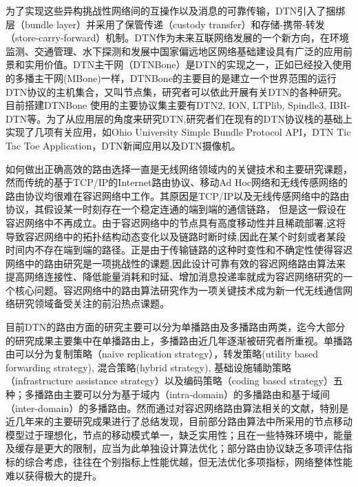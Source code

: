     为了实现这些异构挑战性网络间的互操作以及消息的可靠传输，DTN引入了捆绑层（bundle layer）并采用了保管传递（custody transfer）和存储-携带-转发（store-carry-forward）机制。DTN作为未来互联网络发展的一个新方向，在环境监测、交通管理、水下探测和发展中国家偏远地区网络基础建设具有广泛的应用前景和实用价值。DTN主干网（DTNBone）是DTN的实现之一，正如已经投入使用的多播主干网(MBone)一样，DTNBone的主要目的是建立一个世界范围的运行DTN协议的主机集合，又叫节点集，研究者可以依此开展有关DTN的各种研究。目前搭建DTNBone 使用的主要协议集主要有DTN2, ION, LTPlib, Spindle3, IBR-DTN等。为了从应用层的角度来研究DTN,研究者们在现有的DTN协议栈的基础上实现了几项有关应用，如Ohio University Simple Bundle Protocol API，DTN Tic Tac Toe Application，DTN新闻应用以及DTN摄像机。

如何做出正确高效的路由选择一直是无线网络领域内的关键技术和主要研究课题，然而传统的基于TCP/IP的Internet路由协议、移动Ad Hoc网络和无线传感网络的路由协议均很难在容迟网络中工作。其原因是TCP/IP以及无线传感网络中的路由协议，其假设某一时刻存在一个稳定连通的端到端的通信链路， 但是这一假设在容迟网络中不再成立。由于容迟网络中的节点具有高度移动性并且稀疏部署,这将导致容迟网络中的拓扑结构动态变化以及链路时断时续,因此在某个时刻或者某段时间内不存在端到端的路径。正是由于传输链路的这种时变性和不确定性使得容迟网络中的路由研究是一项挑战性的课题,因此设计可靠有效的容迟网络路由算法来提高网络连接性、降低能量消耗和时延、增加消息投递率就成为容迟网络研究的一个核心问题。容迟网络中的路由算法研究作为一项关键技术成为新一代无线通信网络研究领域备受关注的前沿热点课题。

    目前DTN的路由方面的研究主要可以分为单播路由及多播路由两类，迄今大部分的研究成果主要集中在单播路由上，多播路由近几年逐渐被研究者所重视。单播路由可以分为复制策略（naive replication strategy），转发策略(utility based forwarding strategy), 混合策略(hybrid strategy), 基础设施辅助策略（infrastructure assistance strategy）以及编码策略（coding based strategy）五种；多播路由主要可以分为基于域内（intra-domain）的多播路由和基于域间（inter-domain）的多播路由。然而通过对容迟网络路由算法相关的文献，特别是近几年来的主要研究成果进行了总结发现，目前部分路由算法中所采用的节点移动模型过于理想化，节点的移动模式单一，缺乏实用性；且在一些特殊环境中，能量及缓存是更大的限制，应当为此单独设计算法优化；部分路由协议缺乏多项评估指标的综合考虑，往往在个别指标上性能优越，但无法优化多项指标，网络整体性能难以获得极大的提升。 

